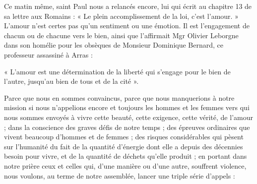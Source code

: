 Ce matin même, saint Paul nous a relancés encore, lui qui écrit au chapitre 13 de sa lettre aux Romains :
« Le plein accomplissement de la loi, c’est l’amour. » L’amour n’est certes pas qu’un sentiment ou une émotion. Il est l’engagement de chacun ou de chacune vers le bien, ainsi que l’affirmait Mgr Olivier Leborgne dans son homélie pour les obsèques de Monsieur Dominique Bernard, ce professeur
assassiné à Arras : \begin{singlequote}
    « L’amour est une détermination de la liberté qui s’engage pour le bien de l’autre, jusqu’au bien de tous et de la cité ».
\end{singlequote}
Parce que nous en sommes convaincus, parce que nous manquerions à notre mission si nous n’appelions encore et toujours les hommes et les femmes vers qui nous sommes envoyés à vivre cette beauté, cette exigence, cette vérité, de l’amour ; dans la conscience des graves défis de notre temps ; des épreuves ordinaires que vivent beaucoup d’hommes et de femmes ; des risques considérables qui pèsent sur l’humanité du fait de la quantité d’énergie dont elle a depuis des décennies besoin pour vivre, et de la quantité de déchets qu’elle produit ; en portant dans notre prière ceux et celles qui, d’une manière ou d’une autre, souffrent violence, nous voulons, au terme de notre assemblée, lancer une triple série d’appels :
